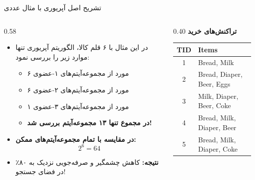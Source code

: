 \begin{frame}{تشریح اصل آپریوری با مثال عددی}{}
\begin{columns}[T,onlytextwidth]
\begin{column}{0.58\textwidth}
\begin{itemize}\setlength{\itemsep}{6pt}
    \item در این مثال با ۶ قلم کالا، الگوریتم آپریوری تنها موارد زیر را بررسی نمود:
    \begin{itemize}\setlength{\itemsep}{3pt}
        \item ۶ مورد از مجموعه‌آیتم‌های ۱-عضوی
        \item ۶ مورد از مجموعه‌آیتم‌های ۲-عضوی
        \item ۱ مورد از مجموعه‌آیتم‌های ۳-عضوی
        \item \textbf{در مجموع تنها ۱۳ مجموعه‌آیتم بررسی شد!}
    \end{itemize}
    \vspace{0.2cm}
    \item \alert{\textbf{در مقایسه با تمام مجموعه‌آیتم‌های ممکن:}}
    \[
    2^6 = 64
    \]
    \item \textbf{نتیجه:} کاهش چشمگیر و صرفه‌جویی نزدیک به ۸۰٪ در فضای جستجو!
\end{itemize}
\end{column}%
\begin{column}{0.40\textwidth}
\centering
\textbf{\small تراکنش‌های خرید}\\[2pt]
\begin{latin}
\fontsize{7.5}{9.5}\selectfont
\begin{tabular}{|c|l|}
\hline
\rowcolor{mannheimblue!15}
\textbf{TID} & \textbf{Items} \\ \hline
1 & Bread, Milk \\ \hline
2 & Bread, Diaper, Beer, Eggs \\ \hline
3 & Milk, Diaper, Beer, Coke \\ \hline
4 & Bread, Milk, Diaper, Beer \\ \hline
5 & Bread, Milk, Diaper, Coke \\ \hline
\end{tabular}
\end{latin}


\end{column}
\end{columns}
\end{frame}
